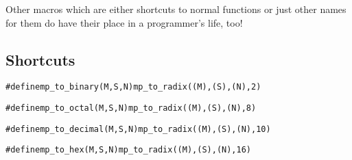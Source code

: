 \documentclass[synpaper]{book}
\begin{document}
Other macros which are either shortcuts to normal functions or just other names for them do have
their place in a programmer's life, too!

\subsection{Shortcuts}

\begin{alltt}
#define mp_to_binary(M, S, N)  mp_to_radix((M), (S), (N), 2)
\end{alltt}

\begin{alltt}
#define mp_to_octal(M, S, N)   mp_to_radix((M), (S), (N), 8)
\end{alltt}

\begin{alltt}
#define mp_to_decimal(M, S, N) mp_to_radix((M), (S), (N), 10)
\end{alltt}

\begin{alltt}
#define mp_to_hex(M, S, N)     mp_to_radix((M), (S), (N), 16)
\end{alltt}
\end{document}
